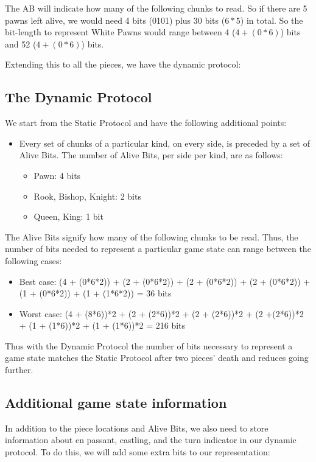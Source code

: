 \documentclass{article}
\begin{document}
The AB will indicate how many of the following chunks to read. So if there are 5 pawns left alive, we would need 4 bits (0101) plus 30 bits ($6*5$) in total. So the bit-length to represent White Pawns would range between 4 ($4+(0*6)$) bits and 52 ($4+(0*6)$) bits.

Extending this to all the pieces, we have the dynamic protocol:

\subsection{The Dynamic Protocol}
We start from the Static Protocol and have the following additional points:

\begin{itemize}
    \item Every set of chunks of a particular kind, on every side, is preceded by a set of Alive Bits. The number of Alive Bits, per side per kind, are as follows:
    \begin{itemize}
        \item Pawn: 4 bits
        \item Rook, Bishop, Knight: 2 bits
        \item Queen, King: 1 bit
    \end{itemize}
\end{itemize}

The Alive Bits signify how many of the following chunks to be read. Thus, the number of bits needed to represent a particular game state can range between the following cases:
\begin{itemize}
    \item Best case: (4 + (0*6*2)) + (2 + (0*6*2)) + (2 + (0*6*2)) + (2 + (0*6*2)) + (1 + (0*6*2)) + (1 + (1*6*2)) = 36 bits
    \item Worst case: (4 + (8*6))*2 + (2 + (2*6))*2 + (2 + (2*6))*2 + (2 +(2*6))*2 + (1 + (1*6))*2 + (1 + (1*6))*2 = 216 bits
\end{itemize}

Thus with the Dynamic Protocol the number of bits necessary to represent a game state matches the Static Protocol after two pieces' death and reduces going further.
\newpage

\subsection{Additional game state information}  
   
In addition to the piece locations and Alive Bits, we also need to store information about en passant, castling, and the turn indicator in our dynamic protocol. To do this, we will add some extra bits to our representation:  
   
\end{document}
